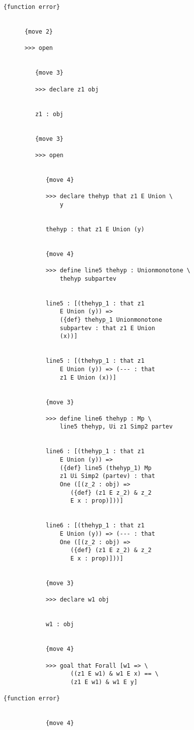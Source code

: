 \documentclass[12pt]{article}
\begin{document}
\begin{verbatim}
{function error}


      {move 2}

      >>> open


         {move 3}

         >>> declare z1 obj


         z1 : obj


         {move 3}

         >>> open


            {move 4}

            >>> declare thehyp that z1 E Union \
                y


            thehyp : that z1 E Union (y)


            {move 4}

            >>> define line5 thehyp : Unionmonotone \
                thehyp subpartev


            line5 : [(thehyp_1 : that z1 
                E Union (y)) => 
                ({def} thehyp_1 Unionmonotone 
                subpartev : that z1 E Union 
                (x))]


            line5 : [(thehyp_1 : that z1 
                E Union (y)) => (--- : that 
                z1 E Union (x))]


            {move 3}

            >>> define line6 thehyp : Mp \
                line5 thehyp, Ui z1 Simp2 partev


            line6 : [(thehyp_1 : that z1 
                E Union (y)) => 
                ({def} line5 (thehyp_1) Mp 
                z1 Ui Simp2 (partev) : that 
                One ([(z_2 : obj) => 
                   ({def} (z1 E z_2) & z_2 
                   E x : prop)]))]


            line6 : [(thehyp_1 : that z1 
                E Union (y)) => (--- : that 
                One ([(z_2 : obj) => 
                   ({def} (z1 E z_2) & z_2 
                   E x : prop)]))]


            {move 3}

            >>> declare w1 obj


            w1 : obj


            {move 4}

            >>> goal that Forall [w1 => \
                   ((z1 E w1) & w1 E x) == \
                   (z1 E w1) & w1 E y]

{function error}


            {move 4}


\end{verbatim}
\end{document}
